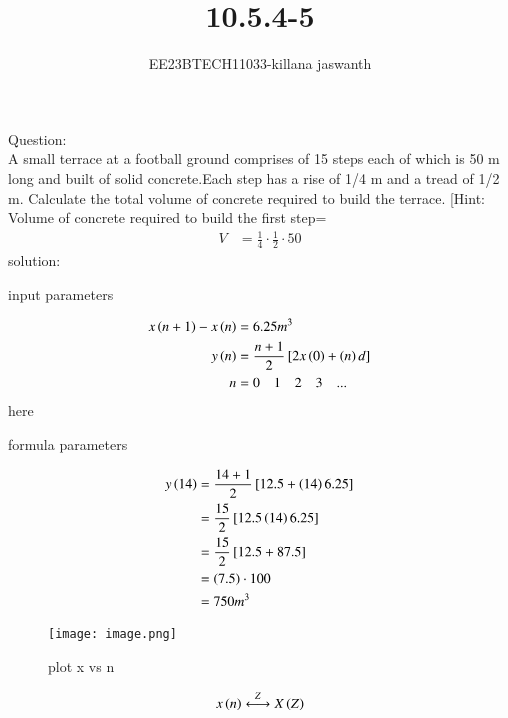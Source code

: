 \documentclass[journal,12pt,twocolumn]{IEEEtran}
\theoremstyle{remark}
\begin{document}

\vspace{3cm}

\title{10.5.4-5}
\author{EE23BTECH11033-killana jaswanth}
\maketitle
\newpage

\bigskip

\renewcommand{\thefigure}{\theenumi}
\renewcommand{\thetable}{\theenumi}
Question:\\
A small terrace at a football ground comprises of 15 steps each of which is 50
m long and built of solid concrete.Each step has a rise of 1/4 m and a tread of
1/2 m. Calculate the total volume of concrete required to build the terrace.
[Hint: Volume of concrete required to build the first step=\begin{align}
    V&=\frac{1}{4} \cdot \frac{1}{2} \cdot 50 
\end{align}
solution:
\begin{table}[!ht]
 \centering
  
   \caption{input parameters}
   \label{tab:10.5.4.5}
   \end{table}
\begin{align}
x\left(n+1\right)-x\left(n\right)&=6.25m^3\\
y\left(n\right) &= \frac{n+1}{2} {}\left[2x\left(0\right)+\left(n\right)d\right] \\ 
n&=0\quad1\quad2\quad3\quad...
\end{align}
here\begin{table}[!ht]
 \centering
  
   \caption{formula parameters}
   \label{tab:10.5.4.5}
   \end{table}
\begin{align}
y\left(14\right) &= \frac{14+1}{2} {}\left[12.5+\left(14\right)6.25\right]\\
 &= \frac{15}{2}{}\left[12.5\left(14\right)6.25\right]\\
&= \frac{15}{2} {}\left[12.5+87.5\right]\\
   &=\left(7.5\right) \cdot 100\\
   &=750m^3
   \end{align}
\begin{figure}[!ht]
    \centering
    \texttt{[image: image.png]}
    \caption{plot x vs n}
    \label{fig:enter-label}
\end{figure}
\begin{align}
x\left(n\right)\overset{Z}{\longleftrightarrow}  X\left(Z\right)
\end{align}
\end{document}
